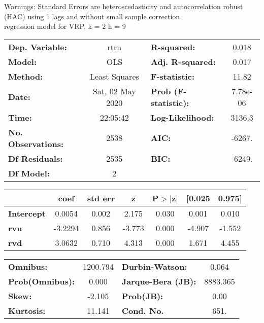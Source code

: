 Warnings: \newline
 [1] Standard Errors are heteroscedasticity and autocorrelation robust (HAC) using 1 lags and without small sample correction\\ 

regression model for VRP, k = 2 h = 9\begin{center}
\begin{tabular}{lclc}
\toprule
\textbf{Dep. Variable:}    &       rtrn       & \textbf{  R-squared:         } &     0.018   \\
\textbf{Model:}            &       OLS        & \textbf{  Adj. R-squared:    } &     0.017   \\
\textbf{Method:}           &  Least Squares   & \textbf{  F-statistic:       } &     11.82   \\
\textbf{Date:}             & Sat, 02 May 2020 & \textbf{  Prob (F-statistic):} &  7.78e-06   \\
\textbf{Time:}             &     22:05:42     & \textbf{  Log-Likelihood:    } &    3136.3   \\
\textbf{No. Observations:} &        2538      & \textbf{  AIC:               } &    -6267.   \\
\textbf{Df Residuals:}     &        2535      & \textbf{  BIC:               } &    -6249.   \\
\textbf{Df Model:}         &           2      & \textbf{                     } &             \\
\bottomrule
\end{tabular}
\begin{tabular}{lcccccc}
                   & \textbf{coef} & \textbf{std err} & \textbf{z} & \textbf{P$> |$z$|$} & \textbf{[0.025} & \textbf{0.975]}  \\
\midrule
\textbf{Intercept} &       0.0054  &        0.002     &     2.175  &         0.030        &        0.001    &        0.010     \\
\textbf{rvu}       &      -3.2294  &        0.856     &    -3.773  &         0.000        &       -4.907    &       -1.552     \\
\textbf{rvd}       &       3.0632  &        0.710     &     4.313  &         0.000        &        1.671    &        4.455     \\
\bottomrule
\end{tabular}
\begin{tabular}{lclc}
\textbf{Omnibus:}       & 1200.794 & \textbf{  Durbin-Watson:     } &    0.064  \\
\textbf{Prob(Omnibus):} &   0.000  & \textbf{  Jarque-Bera (JB):  } & 8883.365  \\
\textbf{Skew:}          &  -2.105  & \textbf{  Prob(JB):          } &     0.00  \\
\textbf{Kurtosis:}      &  11.141  & \textbf{  Cond. No.          } &     651.  \\
\bottomrule
\end{tabular}
\end{center}

